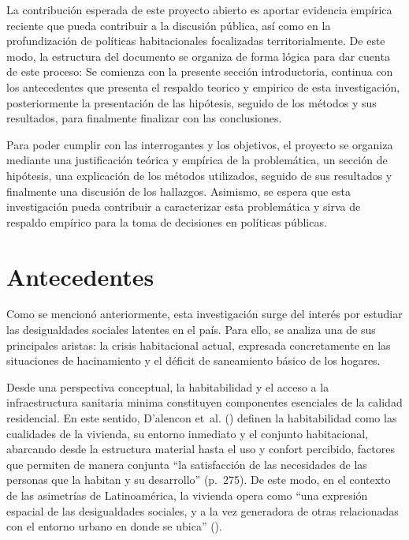 \documentclass[
  spanish,
  a4paper,
  oneside]{scrbook}
\begin{document}
La contribución esperada de este proyecto abierto es aportar evidencia
empírica reciente que pueda contribuir a la discusión pública, así como
en la profundización de políticas habitacionales focalizadas
territorialmente. De este modo, la estructura del documento se organiza
de forma lógica para dar cuenta de este proceso: Se comienza con la
presente sección introductoria, continua con los antecedentes que
presenta el respaldo teorico y empirico de esta investigación,
posteriormente la presentación de las hipótesis, seguido de los métodos
y sus resultados, para finalmente finalizar con las conclusiones.

Para poder cumplir con las interrogantes y los objetivos, el proyecto se
organiza mediante una justificación teórica y empírica de la
problemática, un sección de hipótesis, una explicación de los métodos
utilizados, seguido de sus resultados y finalmente una discusión de los
hallazgos. Asimismo, se espera que esta investigación pueda contribuir a
caracterizar esta problemática y sirva de respaldo empírico para la toma
de decisiones en políticas públicas.


\chapter{Antecedentes}\label{antecedentes}

Como se mencionó anteriormente, esta investigación surge del interés por
estudiar las desigualdades sociales latentes en el país. Para ello, se
analiza una de sus principales aristas: la crisis habitacional actual,
expresada concretamente en las situaciones de hacinamiento y el déficit
de saneamiento básico de los hogares.

Desde una perspectiva conceptual, la habitabilidad y el acceso a la
infraestructura sanitaria minima constituyen componentes esenciales de
la calidad residencial. En este sentido, D'alencon et~al.
() definen la habitabilidad como las
cualidades de la vivienda, su entorno inmediato y el conjunto
habitacional, abarcando desde la estructura material hasta el uso y
confort percibido, factores que permiten de manera conjunta ``la
satisfacción de las necesidades de las personas que la habitan y su
desarrollo'' (p.~275). De este modo, en el contexto de las asimetrías de
Latinoamérica, la vivienda opera como ``una expresión espacial de las
desigualdades sociales, y a la vez generadora de otras relacionadas con
el entorno urbano en donde se ubica'' ().
\end{document}
